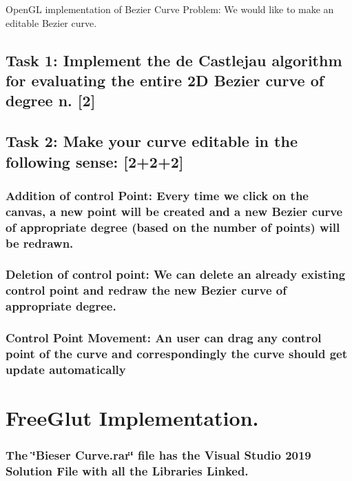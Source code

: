 Open\+GL implementation of Bezier Curve Problem\+: We would like to make an editable Bezier curve.~\newline
~\newline
 \subsection*{Task 1\+: Implement the de Castlejau algorithm for evaluating the entire 2D Bezier curve of degree n. \mbox{[}2\mbox{]}~\newline
~\newline
}

\subsection*{Task 2\+: Make your curve editable in the following sense\+: \mbox{[}2+2+2\mbox{]}~\newline
~\newline
}

\subsubsection*{Addition of control Point\+: Every time we click on the canvas, a new point will be created and a new Bezier curve of appropriate degree (based on the number of points) will be redrawn.}

\subsubsection*{Deletion of control point\+: We can delete an already existing control point and redraw the new Bezier curve of appropriate degree.}

\subsubsection*{Control Point Movement\+: An user can drag any control point of the curve and correspondingly the curve should get update automatically}

\section*{Free\+Glut Implementation.}

\subsubsection*{The \char`\"{}\+Bieser Curve.\+rar\char`\"{} file has the Visual Studio 2019 Solution File with all the Libraries Linked.}

